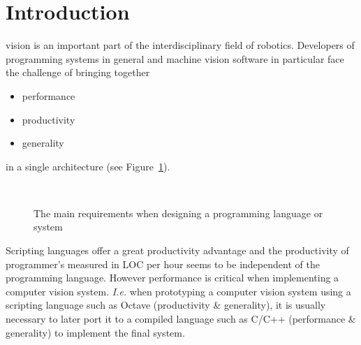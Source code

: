 \documentclass[10pt,journal,compsoc]{joser1}
\newcommand{\fig}[1]{Figure~\ref{fig:#1}}
\begin{document}
\maketitle

\section{Introduction}
 vision is an important part of the interdisciplinary
field of robotics. Developers of programming systems in general and machine
vision software in particular face the challenge of bringing together
\begin{itemize}
  \item performance
  \item productivity
  \item generality
\end{itemize}
in a single architecture (see \fig{triangle}).
\begin{figure}[htbp]
   \begin{center}
     \\
     \caption{The main requirements when designing a programming language or
     system \citep{wolczko2011}\label{fig:triangle}}
   \end{center}
\end{figure}

Scripting languages offer a great productivity advantage and the productivity
of programmer's measured in \ac{LOC} per hour seems to be independent of the
programming language\citep{prechelt2000empirical}. However performance is
critical when implementing a computer vision system. \emph{I.e.} when
prototyping a computer vision system using a scripting language such as Octave
(productivity \& generality), it is usually necessary to later port it to a
compiled language such as C/C++ (performance \& generality) to implement the
final system.
\end{document}
